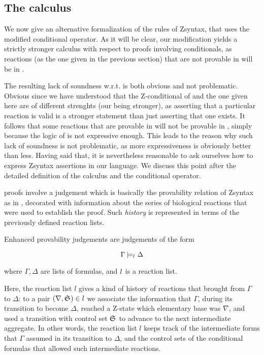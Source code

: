 \subsection{The calculus \eznd{}}

We now give an alternative formalization of the rules of Zsyntax, that uses the
modified conditional operator.
As it will be clear, our modification yields a strictly stronger calculus with
respect to proofs involving conditionals, as reactions (as the one given in the
previous section) that are not provable in \znd{} will be in \eznd{}.

The resulting lack of soundness w.r.t. \znd{} is both obvious and not
problematic. Obvious since we have understood that the Z-conditional of \znd{}
and the one given here are of different strenghts (our being stronger), as
asserting that a particular reaction is valid is a stronger statement than just
asserting that one exists. It follows that some reactions that are provable in
\eznd{} will not be provable in \znd{}, simply because the logic of \znd{} is
not expressive enough. This leads to the reason why such lack of soundness is
not problematic, as more expressiveness is obviously better than less.  Having
said that, it is nevertheless reasonable to ask ourselves how to express Zsyntax
assertions in our language. We discuss this point after the detailed definition
of the calculus and the conditional operator.

\eznd{} proofs involve a judgement which is basically the provability relation
of Zsyntax as in \cite{adding-logic}, decorated with information about the
series of biological reactions that were used to establish the proof. Such
\emph{history} is represented in terms of the previously defined reaction lists.

\begin{definition}
  Enhanced provability judgements are judgements of the form

  \[
    \Gamma \models_{l_{}} \Delta
  \]

  where $\Gamma, \Delta$ are lists of formulas, and $l_{}$ is a reaction
  list.
\end{definition}

Here, the reaction list $l$ gives a kind of history of reactions that brought
from $\Gamma$ to $\Delta$: to a pair $(\nabla, \mathfrak{S}_{}) \in l$ we associate
the information that $\Gamma$, during its transition to become $\Delta$, reached
a Z-state which elementary base was $\nabla$, and used a transition with
control set $\mathfrak{S}_{}$ to advance to the next intermediate aggregate.
In other words, the reaction list $l$ keeps track of the intermediate forms that
$\Gamma$ assumed in its transition to $\Delta$, and the control sets of the
conditional formulas that allowed such intermediate reactions.


